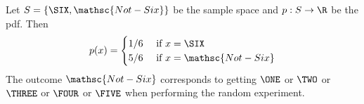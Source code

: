 
Let $S = \{\SIX, \mathsc{Not-Six}\}$ be the sample space
and $p : S \rightarrow \R$ be the pdf.
Then
\[
p(x)
=
\begin{cases}
1/6 & \text{ if } x = \SIX \\
5/6 & \text{ if } x = \mathsc{Not-Six}
\end{cases}
\]
The outcome $\mathsc{Not-Six}$ 
corresponds to getting $\ONE$ or $\TWO$ or $\THREE$ or $\FOUR$ or $\FIVE$
when performing the random experiment.
